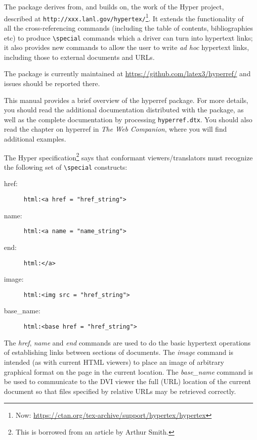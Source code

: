 \documentclass{article}
\newcommand*{\cs}[1]{%
  \texttt{\textbackslash #1}%
}
\newcommand*{\xpackage}[1]{\textsf{#1}}
\begin{document}
The package derives from, and builds on, the work of the Hyper
project, described at \nolinkurl{http://xxx.lanl.gov/hypertex/}\footnote{Now: \url{https://ctan.org/tex-archive/support/hypertex/hypertex}}. It extends
the functionality of all the  cross-referencing commands
(including the table of contents, bibliographies etc) to produce
\cs{special} commands which a driver can turn into hypertext links;
it also provides new commands to allow the user to write \emph{ad hoc}
hypertext links, including those to external documents and URLs.

The package is currently maintained at \url{https://github.com/latex3/hyperref/} and issues should
be reported there.

This manual provides a brief overview of the \xpackage{hyperref}
package. For more details, you should read the additional documentation
distributed with the package, as well as the complete documentation by
processing \texttt{hyperref.dtx}. You should also read the chapter on
\xpackage{hyperref} in \textit{The  Web Companion}, where you will
find additional examples.

The Hyper specification\footnote{This is borrowed from an article
by Arthur Smith.} says that conformant viewers/translators must
recognize the following set of \cs{special} constructs:

\begin{description}
\item[href:] \verb|html:<a href = "href_string">|
\item[name:] \verb|html:<a name = "name_string">|
\item[end:] \verb|html:</a>|
\item[image:] \verb|html:<img src = "href_string">|
\item[base\_name:] \verb|html:<base href = "href_string">|
\end{description}

The \emph{href}, \emph{name} and \emph{end} commands are used to do the
basic hypertext operations of establishing links between sections of
documents. The \emph{image} command is intended (as with current HTML
viewers) to place an image of arbitrary graphical format on the page in
the current location. The \emph{base\_name} command is be used to
communicate to the DVI viewer the full (URL) location of the current
document so that files specified by relative URLs may be retrieved
correctly.
\end{document}

